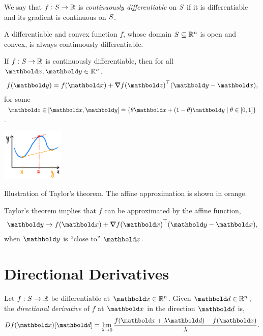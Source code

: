 \begin{defn} We say that $f : S \to \mathbb{R}$ is \emph{continuously differentiable} on $S$ if it is differentiable and its gradient is continuous on $S$.
\end{defn}
\begin{lem} A differentiable and convex function $f$, whose domain $S \subseteq \mathbb{R}^n$ is open and convex, is always continuously differentiable.
\end{lem}

\begin{thm} If $f: S \to \mathbb{R}$ is continuously differentiable, then for all $\vx, \vy \in \R^n$, \begin{align}
    f(\vy) = f(\vx) + \trans{\grad f(\vz)}(\vy - \vx),
\end{align} for some $\vz \in [\vx, \vy] \defeq \{\theta\vx + (1-\theta)\vy \mid \theta \in [0,1]\}$.
\end{thm}\begin{marginfigure}
\centering\includegraphics[width=3cm]{notes/figures/taylors_theorem.png}
\caption{Illustration of Taylor's theorem. The affine approximation is shown in orange.}
\end{marginfigure}\noindent Taylor's theorem implies that $f$ can be approximated by the affine function, \begin{align*}
    \vy \to f(\vx) + \trans{\grad f(\vx)}(\vy - \vx),
\end{align*} when $\vy$ is ``close to'' $\vx$.

\section{Directional Derivatives}

\begin{defn} Let $f: S \to \mathbb{R}$ be differentiable at $\vx \in \R^n$. Given $\vd \in \R^n$, the \emph{directional derivative} of $f$ at $\vx$ in the direction $\vd$ is, \begin{align}
    D f(\vx)[\vd] \defeq \lim_{\lambda \to 0} \frac{f(\vx + \lambda\vd) - f(\vx)}{\lambda}.
\end{align}
\end{defn}

